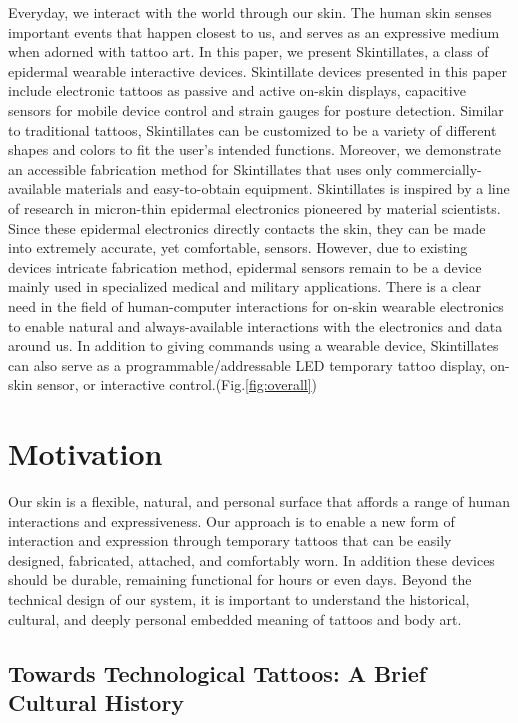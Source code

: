\documentclass{sigchi}
\begin{document}
Everyday, we interact with the world through our skin. The human skin senses important events that happen closest to us, and serves as an expressive medium when adorned with tattoo art. In this paper, we present Skintillates, a class of epidermal wearable interactive devices. Skintillate devices presented in this paper include electronic tattoos as passive and active on-skin displays, capacitive sensors for mobile device control and strain gauges for posture detection. Similar to traditional tattoos, Skintillates can be customized to be a variety of different shapes and colors to fit the user’s intended functions. Moreover, we demonstrate an accessible fabrication  method  for Skintillates that  uses  only  commercially-available materials and easy-to-obtain equipment. Skintillates is inspired by a line of research in micron-thin epidermal electronics pioneered by material scientists. Since these epidermal electronics directly contacts the skin, they can be made into extremely accurate, yet comfortable, sensors. However, due to existing devices intricate fabrication method, epidermal sensors remain to be a device mainly used in specialized medical and military applications. There is a clear need in the field of human-computer interactions for on-skin wearable electronics to enable natural and always-available interactions with the electronics and data around us\cite{MunehikoSato:2012we,chris:2011ve,ChrisHarrison:2010vi,DavidKim:2012uu,Harrison:2014ft,Laput:2014du}. In addition to giving commands using a wearable device, Skintillates can also serve as a programmable/addressable LED temporary tattoo display, on-skin sensor, or interactive control.(Fig.\ref{fig:overall}) 

\section{Motivation}
Our skin is a flexible, natural, and personal surface that affords a range of human interactions and expressiveness.  Our approach is to enable a new form of interaction and expression through temporary tattoos that can be easily designed, fabricated, attached, and comfortably worn.  In addition these devices should be durable, remaining functional for hours or even days. Beyond the technical design of our system, it is important to understand the historical, cultural, and deeply personal embedded meaning of tattoos and body art. 

\subsection{Towards Technological Tattoos: A Brief Cultural History}
\end{document}
